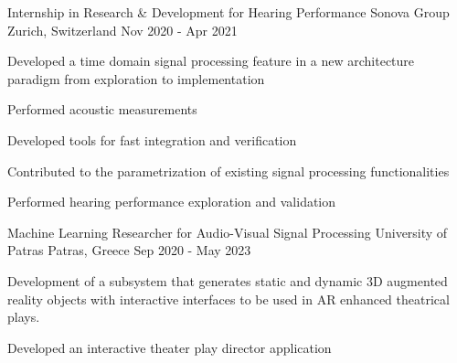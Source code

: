 

\begin{cventries}

  \cventry
    {Internship in Research \& Development for Hearing Performance} %
    {Sonova Group} %
    {Zurich, Switzerland} %
    {Nov 2020 - Apr 2021} %
    {
      \begin{cvitems} %
        \item {Developed a time domain signal processing feature in a new architecture paradigm from exploration to implementation}
        \item {Performed acoustic measurements}
        \item {Developed tools for fast integration and verification}
        \item {Contributed to the parametrization of existing signal processing functionalities}
        \item {Performed hearing performance exploration and validation}
      \end{cvitems}
    }

  \cventry
    {Machine Learning Researcher for Audio-Visual Signal Processing} %
    {University of Patras} %
    {Patras, Greece} %
    {Sep 2020 - May 2023} %
    {
      \begin{cvitems} %
        \item {Development of a subsystem that generates static and dynamic 3D augmented reality objects with interactive interfaces to be used in AR enhanced theatrical plays.}
        \item {Developed an interactive theater play director application}
      \end{cvitems}
    }

\end{cventries}
